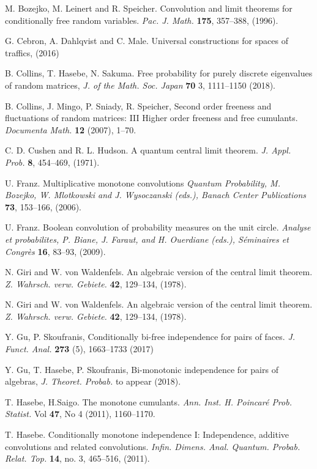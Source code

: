 \documentclass[ECP]{ejpecp} %
\begin{document}
\begin{thebibliography}{99}
 M. Bozejko, M. Leinert and R. Speicher. Convolution and limit theorems for conditionally
free random variables. \emph{Pac. J. Math.} {\bf 175}, 357--388, (1996).

 G. Cebron, A. Dahlqvist and C. Male. Universal constructions for spaces of traffics, (2016)

 B. Collins, T. Hasebe, N. Sakuma. Free probability for purely discrete eigenvalues of random matrices, \emph{J. of the Math. Soc. Japan} {\bf 70} 3, 1111--1150 (2018).

 B. Collins, J. Mingo, P. Sniady, R. Speicher, Second order freeness and fluctuations of random matrices: III Higher order freeness and free cumulants. \emph{Documenta Math.} {\bf 12} (2007), 1--70.

 C. D. Cushen and R. L. Hudson. A quantum central limit theorem. \emph{J. Appl. Prob.} {\bf 8},
454--469, (1971).

 U. Franz. Multiplicative monotone convolutions \emph{Quantum Probability, M. Bozejko, W. Mlotkowski and J. Wysoczanski (eds.), Banach Center Publications} {\bf 73}, 153--166, (2006).

 U. Franz. Boolean convolution of probability measures on the unit circle. \emph{Analyse et probabilites, P. Biane, J. Faraut, and H. Ouerdiane (eds.), Séminaires et Congrès} {\bf 16}, 83--93, (2009).

 N. Giri and W. von Waldenfels. An algebraic version of the central limit theorem. \emph{Z. Wahrsch. verw. Gebiete.}
{\bf 42}, 129--134, (1978).

 N. Giri and W. von Waldenfels. An algebraic version of the central limit theorem. \emph{Z. Wahrsch. verw. Gebiete.}
{\bf 42}, 129--134, (1978).

 Y. Gu, P. Skoufranis, Conditionally bi-free independence for pairs of faces. \emph{J. Funct. Anal.} {\bf 273} (5), 1663--1733 (2017)

 Y. Gu, T. Hasebe, P. Skoufranis, Bi-monotonic independence for pairs of algebras, \emph{J. Theoret. Probab.} to appear (2018).

 T. Hasebe, H.Saigo. The monotone cumulants. \emph{Ann. Inst. H. Poincaré Prob. Statist.} Vol {\bf 47}, No 4 (2011), 1160--1170.

 T. Hasebe. Conditionally monotone independence I: Independence, additive convolutions and related convolutions. \emph{Infin. Dimens. Anal. Quantum. Probab. Relat. Top.} {\bf 14}, no. 3, 465--516, (2011).


\end{thebibliography}
\end{document}

